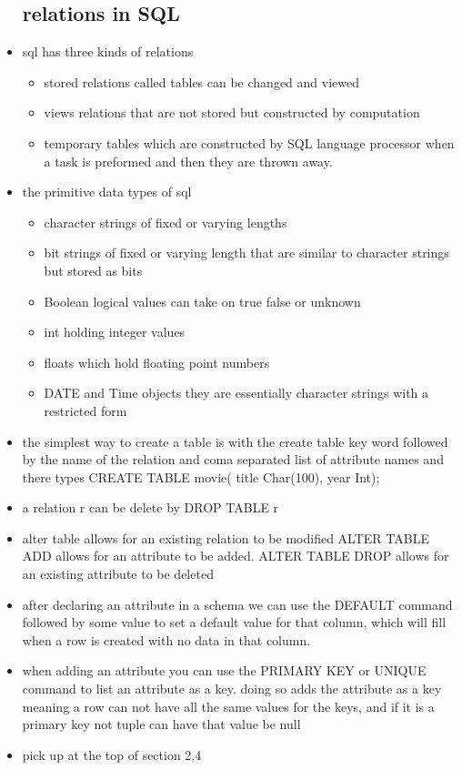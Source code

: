 \documentclass{article}
\begin{document}
\begin{itemize}
\subsection{relations in SQL}
\item sql has three kinds of relations 
\begin{itemize}
    \item stored relations called tables can be changed and viewed
    \item views relations that are not stored but constructed by computation 
    \item temporary tables which are constructed by SQL language processor when a task is preformed and then they are thrown away. 
\end{itemize}
\item the primitive data types of sql
\begin{itemize}
    \item character strings of fixed or varying lengths 
    \item bit strings of fixed or varying length that are similar to character strings but stored as bits
    \item Boolean logical values can take on true false or unknown  
    \item int holding integer values 
    \item floats which hold floating point numbers
    \item DATE and Time objects they are essentially character strings with a restricted form 
\end{itemize}
\item the simplest way to create a table is with the create table key word followed by the name of the relation and coma separated list of attribute names and there types CREATE TABLE movie( title Char(100), year Int);
\item a relation r can be delete by DROP TABLE r
\item alter table allows for an existing relation to be modified ALTER TABLE ADD allows for an attribute to be added. ALTER TABLE DROP allows for an existing attribute to be deleted
\item after declaring an attribute in a schema we can use the DEFAULT command followed by some value to set a default value for that column, which will fill when a row is created with no data in that column. 
\item when adding an attribute you can use the PRIMARY KEY or UNIQUE command to list an attribute as a key. doing so adds the attribute as a key meaning a row can not have all the same values for the keys, and if it is a primary key not tuple can have that value be null
\item pick up at the top of section 2,4 

\end{itemize}
\end{document}
